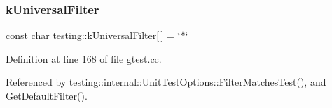 \subsubsection{\texorpdfstring{k\+Universal\+Filter}{kUniversalFilter}}
{\footnotesize\ttfamily const char testing\+::k\+Universal\+Filter\mbox{[}$\,$\mbox{]} = \char`\"{}$\ast$\char`\"{}\hspace{0.3cm}{\ttfamily [static]}}



Definition at line 168 of file gtest.\+cc.



Referenced by testing\+::internal\+::\+Unit\+Test\+Options\+::\+Filter\+Matches\+Test(), and Get\+Default\+Filter().

